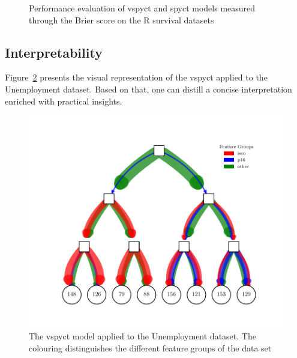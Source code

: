 \documentclass[3p,review,authoryear]{elsarticle}
\begin{document}
\begin{figure}[h!]

\caption{Performance evaluation of \gls{vspyct} and \gls{spyct} models measured through the Brier score on the R survival datasets}
\label{fig:brier_scores}
\end{figure}


\subsection{Interpretability}


Figure~\ref{fig:inter_tree} presents the visual representation of the \gls{vspyct} applied to the Unemployment dataset.
Based on that, one can distill a concise interpretation enriched with practical insights.

\begin{figure}[h!]
    \centering
    \includegraphics{hecat_tree_old_temp.pdf}
    \caption{The \gls{vspyct} model applied to the Unemployment dataset. The colouring distinguishes the different feature groups of the data set}
    \label{fig:inter_tree}
\end{figure}
\end{document}
